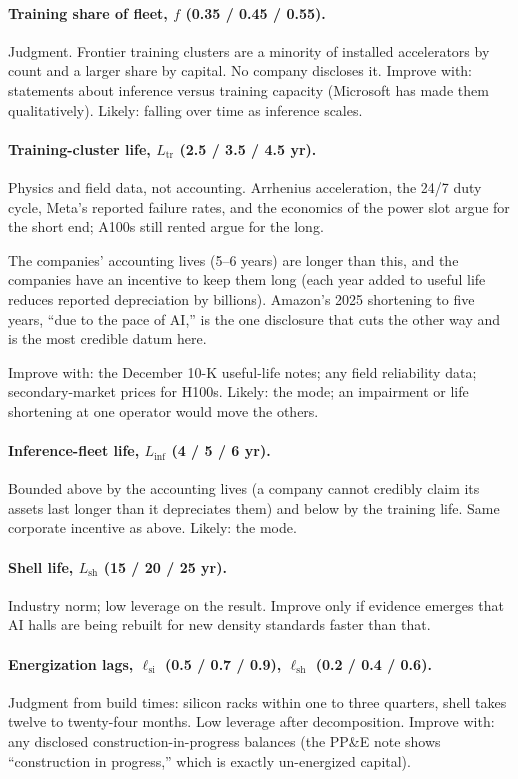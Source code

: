 \documentclass[11pt,letterpaper]{article}
\begin{document}
\paragraph{Training share of fleet, $f$ (0.35 / 0.45 / 0.55).} Judgment. Frontier training clusters are a minority of installed accelerators by count and a larger share by capital. No company discloses it. Improve with: statements about inference versus training capacity (Microsoft has made them qualitatively). Likely: falling over time as inference scales.

\paragraph{Training-cluster life, $L_{\text{tr}}$ (2.5 / 3.5 / 4.5 yr).} Physics and field data, not accounting. Arrhenius acceleration, the 24/7 duty cycle, Meta's reported failure rates, and the economics of the power slot argue for the short end; A100s still rented argue for the long.

The companies' accounting lives (5--6 years) are longer than this, and the companies have an incentive to keep them long (each year added to useful life reduces reported depreciation by billions). Amazon's 2025 shortening to five years, ``due to the pace of AI,'' is the one disclosure that cuts the other way and is the most credible datum here.

Improve with: the December 10-K useful-life notes; any field reliability data; secondary-market prices for H100s. Likely: the mode; an impairment or life shortening at one operator would move the others.

\paragraph{Inference-fleet life, $L_{\text{inf}}$ (4 / 5 / 6 yr).} Bounded above by the accounting lives (a company cannot credibly claim its assets last longer than it depreciates them) and below by the training life. Same corporate incentive as above. Likely: the mode.

\paragraph{Shell life, $L_{\text{sh}}$ (15 / 20 / 25 yr).} Industry norm; low leverage on the result. Improve only if evidence emerges that AI halls are being rebuilt for new density standards faster than that.

\paragraph{Energization lags, $\ell_{\text{si}}$ (0.5 / 0.7 / 0.9), $\ell_{\text{sh}}$ (0.2 / 0.4 / 0.6).} Judgment from build times: silicon racks within one to three quarters, shell takes twelve to twenty-four months. Low leverage after decomposition. Improve with: any disclosed construction-in-progress balances (the PP\&E note shows ``construction in progress,'' which is exactly un-energized capital).
\end{document}
